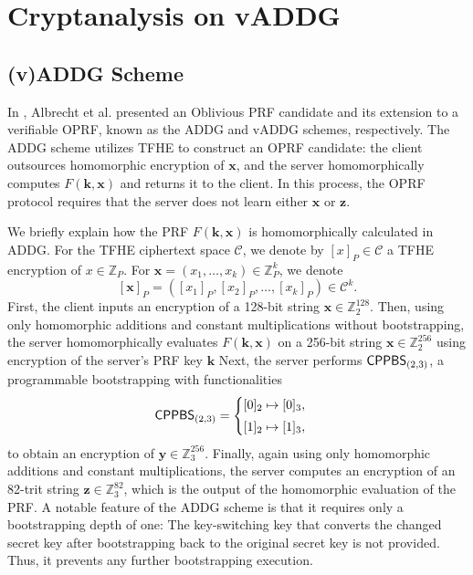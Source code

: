 \documentclass[runningheads]{llncs}
\begin{document}
%
%

\section{Cryptanalysis on vADDG} \label{subsec:SHE}
    \subsection{(v)ADDG Scheme}
    In \cite{cryptoeprint:PRF}, Albrecht et al. presented an Oblivious PRF candidate and its extension to a verifiable OPRF, known as the ADDG and vADDG schemes, respectively. The ADDG scheme utilizes TFHE to construct an OPRF candidate: the client outsources homomorphic encryption of \(\mathbf{x}\), and the server homomorphically computes \(F(\mathbf{k},\mathbf{x})\) and returns it to the client. In this process, the OPRF protocol requires that the server does not learn either \(\mathbf{x}\) or \(\mathbf{z}\).
    
    We briefly explain how the PRF \(F(\mathbf{k},\mathbf{x})\) is homomorphically calculated in ADDG. For the TFHE ciphertext space \(\mathcal{C}\), we denote by \([x]_P \in \mathcal{C}\) a TFHE encryption of \(x \in \mathbb{Z}_P\). For \(\mathbf{x}=(x_1,\dots,x_k)\in \mathbb{Z}_P^k\), we denote
        \[
            [\mathbf{x}]_P=([x_1]_P,[x_2]_P,\dots,[x_k]_P)\in \mathcal{C}^k.
        \]
    First, the client inputs an encryption of a 128-bit string \(\mathbf{x}\in \mathbb{Z}_2^{128}\). Then, using only homomorphic additions and constant multiplications without bootstrapping, the server homomorphically evaluates $F(\mathbf{k},\mathbf{x})$ on a 256-bit string \(\mathbf{x}\in \mathbb{Z}_2^{256}\) using encryption of the server's PRF key \(\mathbf{k}\)
    Next, the server performs \({\sf CPPBS}_{(2,3)}\), a programmable bootstrapping with functionalities
        \[
            {\sf CPPBS}_{(2,3)}=\begin{cases}
            [0]_2 \mapsto [0]_3,\\[1mm]
            [1]_2 \mapsto [1]_3,
            \end{cases}
        \]
    to obtain an encryption of \(\mathbf{y}\in \mathbb{Z}_3^{256}\). Finally, again using only homomorphic additions and constant multiplications, the server computes an encryption of an 82-trit string \(\mathbf{z}\in \mathbb{Z}_3^{82}\), which is the output of the homomorphic evaluation of the PRF.
    A notable feature of the ADDG scheme is that it requires only a bootstrapping depth of one: The key-switching key that converts the changed secret key after bootstrapping back to the original secret key is not provided. Thus, it prevents any further bootstrapping execution.
    
\end{document}
